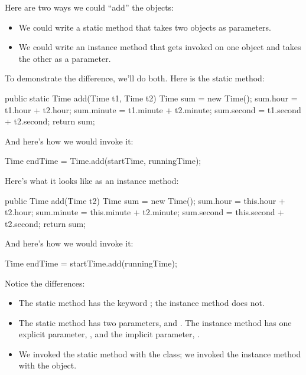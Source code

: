 Here are two ways we could ``add'' the  objects:

\begin{itemize}

\item We could write a static method that takes two  objects as parameters.

\item We could write an instance method that gets invoked on one object and takes the other as a parameter.

\end{itemize}

To demonstrate the difference, we'll do both.
Here is the static method:


\begin{code}
public static Time add(Time t1, Time t2) {
    Time sum = new Time();
    sum.hour = t1.hour + t2.hour;
    sum.minute = t1.minute + t2.minute;
    sum.second = t1.second + t2.second;
    return sum;
}
\end{code}

And here's how we would invoke it:

\begin{code}
Time endTime = Time.add(startTime, runningTime);
\end{code}

Here's what it looks like as an instance method:


\begin{code}
public Time add(Time t2) {
    Time sum = new Time();
    sum.hour = this.hour + t2.hour;
    sum.minute = this.minute + t2.minute;
    sum.second = this.second + t2.second;
    return sum;
}
\end{code}

And here's how we would invoke it:

\begin{code}
Time endTime = startTime.add(runningTime);
\end{code}

Notice the differences:

\begin{itemize}

\item The static method has the keyword ; the instance method does not.

\item The static method has two parameters,  and .
The instance method has one explicit parameter, , and the implicit parameter, .

\item We invoked the static method with the  class;
we invoked the instance method with the  object.

\end{itemize}

